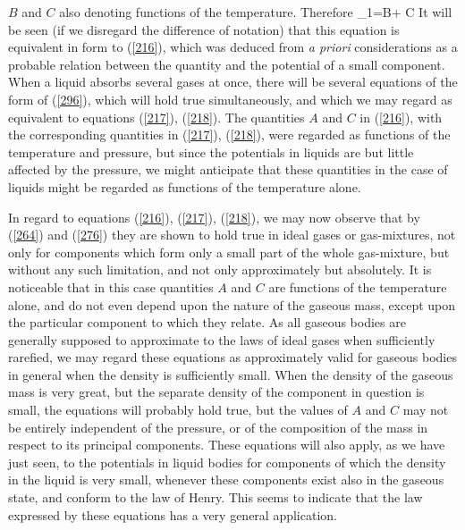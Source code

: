 \documentclass[12pt]{article}
\begin{document}
$B$ and $C$ also denoting functions of the temperature. Therefore
\eqs \mu_1=B+ C \log {} \label{296}\eqe
It will be seen (if we disregard the difference of notation) that this equation is equivalent in form to (\ref{216}), which was deduced from \textit{a priori} considerations as a probable relation between the quantity and the potential of a small component. When a liquid absorbs several gases at once, there will be several equations of the form of (\ref{296}), which will hold true simultaneously, and which we may regard as equivalent to equations (\ref{217}), (\ref{218}). The quantities $A$ and $C$ in (\ref{216}), with the corresponding quantities in (\ref{217}), (\ref{218}), were regarded as functions of the temperature and pressure, but since the potentials in liquids are but little affected by the pressure, we might anticipate that these quantities in the case of liquids might be regarded as functions of the temperature alone.


In regard to equations (\ref{216}), (\ref{217}), (\ref{218}), we may now observe that by (\ref{264}) and (\ref{276}) they are shown to hold true in ideal gases or gas-mixtures, not only for components which form only a small part of the whole gas-mixture, but without any such limitation, and not only approximately but absolutely. It is noticeable that in this case quantities $A$ and $C$ are functions of the temperature alone, and do not even depend upon the nature of the gaseous mass, except upon the particular component to which they relate. As all gaseous bodies are generally supposed to approximate to the laws of ideal gases when sufficiently rarefied, we may regard these equations as approximately valid for gaseous bodies in general when the density is sufficiently small. When the density of the gaseous mass is very great, but the separate density of the component in question is small, the equations will probably hold true, but the values of $A$ and $C$ may not be entirely independent of the pressure, or of the composition of the mass in respect to its principal components. These equations will also apply, as we have just seen, to the potentials in liquid bodies for components of which the density in the liquid is very small, whenever these components exist also in the gaseous state, and conform to the law of Henry. This seems to indicate that the law expressed by these equations has a very general application.

\end{document}
